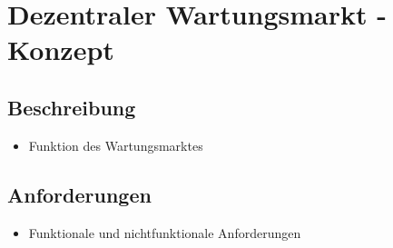 \chapter{Dezentraler Wartungsmarkt - Konzept}
\label{cha:fazit}

\section{Beschreibung}
\begin{itemize}
    \item Funktion des Wartungsmarktes
\end{itemize}

\section{Anforderungen}
\begin{itemize}
    \item Funktionale und nichtfunktionale Anforderungen
\end{itemize}
